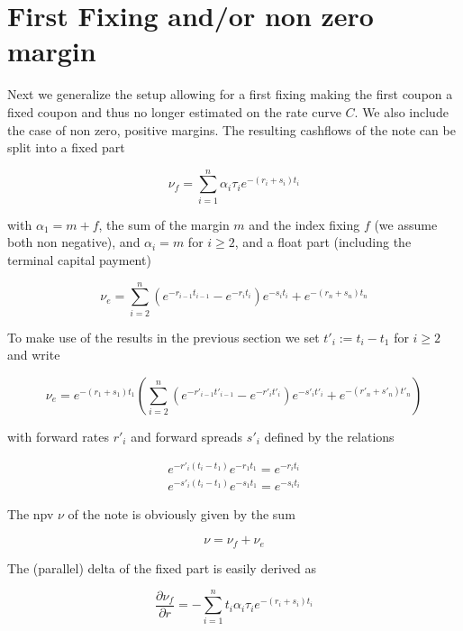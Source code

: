 \documentclass{amsart}
\theoremstyle{plain}
\numberwithin{equation}{section}
\begin{document}
\section{First Fixing and/or non zero margin}

Next we generalize the setup allowing for a first fixing making the first coupon a fixed coupon and thus no longer estimated on the rate curve $C$. We also include the case of non zero, positive margins. The resulting cashflows of the note can be split into a fixed part

\begin{equation}
\nu_f = \sum_{i=1}^n \alpha_i \tau_i e^{-(r_i+s_i) t_i}
\end{equation}

with $\alpha_1 = m + f$, the sum of the margin $m$ and the index fixing $f$ (we assume both non negative), and $\alpha_i = m$ for $i\geq2$, and a float part (including the terminal capital payment)

\begin{equation}
\nu_e = \sum_{i=2}^n (e^{-r_{i-1} t_{i-1}} - e^{-r_i t_i}) e^{-s_i t_i} + e^{-(r_n+s_n) t_n}
\end{equation}

To make use of the results in the previous section we set $t'_i := t_i-t_1$ for $i\geq2$ and write

\begin{equation}
\nu_e = e^{-(r_1+s_1) t_1} \left( \sum_{i=2}^n (e^{-r'_{i-1} t'_{i-1}} - e^{-r'_i t'_i}) e^{-s'_i t'_i} + e^{-(r'_n+s'_n) t'_n} \right)
\end{equation}

with forward rates $r'_i$ and forward spreads $s'_i$ defined by the relations

\begin{eqnarray}
e^{-r'_i (t_i-t_1)}e^{-r_1 t_1} = e^{-r_i t_i}  \\
e^{-s'_i (t_i-t_1)}e^{-s_1 t_1} = e^{-s_i t_i}
\end{eqnarray}

The npv $\nu$ of the note is obviously given by the sum

\begin{equation}
\nu = \nu_f + \nu_e
\end{equation}

The (parallel) delta of the fixed part is easily derived as

\begin{equation}\label{dv01f}
\frac{\partial \nu_f}{\partial r} = -\sum_{i=1}^{n} t_i \alpha_i \tau_i e^{-(r_i+s_i) t_i}
\end{equation}
\end{document}
